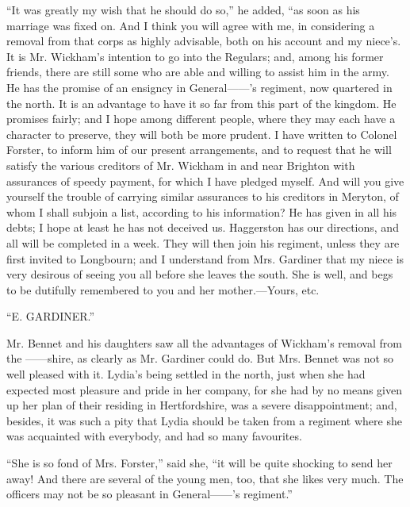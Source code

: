 \documentclass[12pt]{book}
\begin{document}
``It was greatly my wish that he should do so,'' he added, ``as soon as his marriage was fixed on. And I think you will agree with me, in considering a removal from that corps as highly advisable, both on his account and my niece's. It is Mr. Wickham's intention to go into the Regulars; and, among his former friends, there are still some who are able and willing to assist him in the army. He has the promise of an ensigncy in General------'s regiment, now quartered in the north. It is an advantage to have it so far from this part of the kingdom. He promises fairly; and I hope among different people, where they may each have a character to preserve, they will both be more prudent. I have written to Colonel Forster, to inform him of our present arrangements, and to request that he will satisfy the various creditors of Mr. Wickham in and near Brighton with assurances of speedy payment, for which I have pledged myself. And will you give yourself the trouble of carrying similar assurances to his creditors in Meryton, of whom I shall subjoin a list, according to his information? He has given in all his debts; I hope at least he has not deceived us. Haggerston has our directions, and all will be completed in a week. They will then join his regiment, unless they are first invited to Longbourn; and I understand from Mrs. Gardiner that my niece is very desirous of seeing you all before she leaves the south. She is well, and begs to be dutifully remembered to you and her mother.---Yours, etc.

``E. GARDINER.''

Mr. Bennet and his daughters saw all the advantages of Wickham's removal from the ------shire, as clearly as Mr. Gardiner could do. But Mrs. Bennet was not so well pleased with it. Lydia's being settled in the north, just when she had expected most pleasure and pride in her company, for she had by no means given up her plan of their residing in Hertfordshire, was a severe disappointment; and, besides, it was such a pity that Lydia should be taken from a regiment where she was acquainted with everybody, and had so many favourites.

``She is so fond of Mrs. Forster,'' said she, ``it will be quite shocking to send her away! And there are several of the young men, too, that she likes very much. The officers may not be so pleasant in General------'s regiment.''
\end{document}
